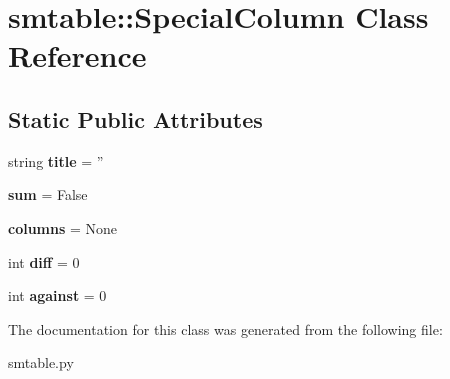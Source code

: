 \hypertarget{classsmtable_1_1SpecialColumn}{
\section{smtable::SpecialColumn Class Reference}
\label{classsmtable_1_1SpecialColumn}
}
\subsection*{Static Public Attributes}
\begin{DoxyCompactItemize}
\item 
\hypertarget{classsmtable_1_1SpecialColumn_a2d043fe418a2031ae4d8c116b4e2a2ce}{
string {\bfseries title} = ''}
\label{classsmtable_1_1SpecialColumn_a2d043fe418a2031ae4d8c116b4e2a2ce}

\item 
\hypertarget{classsmtable_1_1SpecialColumn_af7551459bae5fd11f3353c4379946218}{
{\bfseries sum} = False}
\label{classsmtable_1_1SpecialColumn_af7551459bae5fd11f3353c4379946218}

\item 
\hypertarget{classsmtable_1_1SpecialColumn_a3b0f2d37ec528bc815443eba4c2e49d8}{
{\bfseries columns} = None}
\label{classsmtable_1_1SpecialColumn_a3b0f2d37ec528bc815443eba4c2e49d8}

\item 
\hypertarget{classsmtable_1_1SpecialColumn_a1fe0df90fc57fbe3907820d1bbc0d630}{
int {\bfseries diff} = 0}
\label{classsmtable_1_1SpecialColumn_a1fe0df90fc57fbe3907820d1bbc0d630}

\item 
\hypertarget{classsmtable_1_1SpecialColumn_a7fcd2e6986ce840b78549b2817f84e31}{
int {\bfseries against} = 0}
\label{classsmtable_1_1SpecialColumn_a7fcd2e6986ce840b78549b2817f84e31}

\end{DoxyCompactItemize}


The documentation for this class was generated from the following file:\begin{DoxyCompactItemize}
\item 
smtable.py\end{DoxyCompactItemize}
